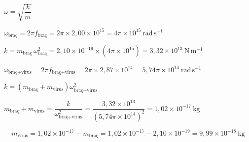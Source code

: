 \begin{solapartat}
 $\omega = \sqrt{\dfrac{k}{m}}$

 $\omega_\text{braç} = 2\pi f_\text{braç} = 2\pi\times 2,00\times 10^{15} = 4\pi\times 10^{15}\ \mathrm{rad\,s^{-1}}$

 $k = m_\text{braç}\,\omega^2_\text{braç} = 2,10\times 10^{-19}\times\left(4\pi\times 10^{15}\right) = 3,32\times 10^{13}\ \mathrm{N\,m^{-1}}$
\end{solapartat}

\begin{solapartat}
 $\omega_{\text{braç+virus}} = 2\pi f_{\text{braç+virus}} = 2\pi\times 2,87\times 10^{14} = 5,74\pi\times 10^{14}\ \mathrm{rad\,s^{-1}}$

 $k = \left(m_\text{braç} + m_\mathrm{virus}\right)\omega^2_{\text{braç+virus}}$

 $m_\text{braç} + m_\mathrm{virus} = \dfrac{k}{\omega^2_{\text{braç+virus}}} = \dfrac{3,32\times 10^{13}}{\left(5,74\pi\times 10^{14}\right)^2} = 1,02\times 10^{-17}\ \mathrm{kg}$

\[ m_\mathrm{virus} = 1,02\times 10^{-17} - m_\text{braç} = 1,02\times 10^{-17} - 2,10\times 10^{-19} = 9,99\times 10^{-18}\ \mathrm{kg} \]
\end{solapartat}
